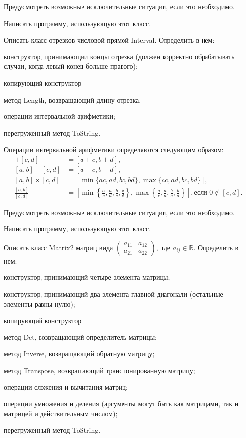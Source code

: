 Предусмотреть возможные исключительные ситуации, если это необходимо.

Написать программу, использующую этот класс.

\task Описать класс отрезков числовой прямой Interval. Определить в нем:
\begin{itemize*}
\item конструктор, принимающий концы отрезка (должен корректно
  обрабатывать случаи, когда левый конец больше правого);
\item копирующий конструктор;
\item метод Length, возвращающий длину отрезка.
\item операции интервальной арифметики;
\item перегруженный метод ToString.
\end{itemize*}

Операции интервальной арифметики определяются следующим образом:
\begin{align*}
  [a, b] + [c, d] &= [a + c, b + d],\\
  [a, b] - [c, d] &= [a - c, b - d],\\
  [a, b] \times [c, d] &=
  [\min \{ac, ad, bc, bd\}, \max \{ac, ad, bc, bd\}],\\
  \frac{[a, b]}{[c, d]} &=
  \left[
    \min \left\{\frac{a}{c}, \frac{a}{d}, \frac{b}{c}, \frac{b}{d}\right\},
    \max \left\{\frac{a}{c}, \frac{a}{d}, \frac{b}{c}, \frac{b}{d}\right\}
    \right], \textrm{если } 0\not\in[c, d].
\end{align*}

Предусмотреть возможные исключительные ситуации, если это необходимо.

Написать программу, использующую этот класс.

\task Описать класс Matrix2 матриц вида
$\begin{pmatrix}
a_{11} & a_{12} \\
a_{21} & a_{22}
\end{pmatrix},$ где $a_{ij} \in \mathbb{R}$. Определить в нем:
\begin{itemize*}
\item конструктор, принимающий четыре элемента матрицы;
\item конструктор, принимающий два элемента главной диагонали
  (остальные элементы равны нулю);
\item копирующий конструктор;
\item метод Det, возвращающий определитель матрицы;
\item метод Inverse, возвращающий обратную матрицу;
\item метод Transpose, возвращающий транспонированную матрицу;
\item операции сложения и вычитания матриц;
\item операции умножения и деления (аргументы могут быть как матрицами,
  так и матрицей и действительным числом);
\item перегруженный метод ToString.
\end{itemize*}

